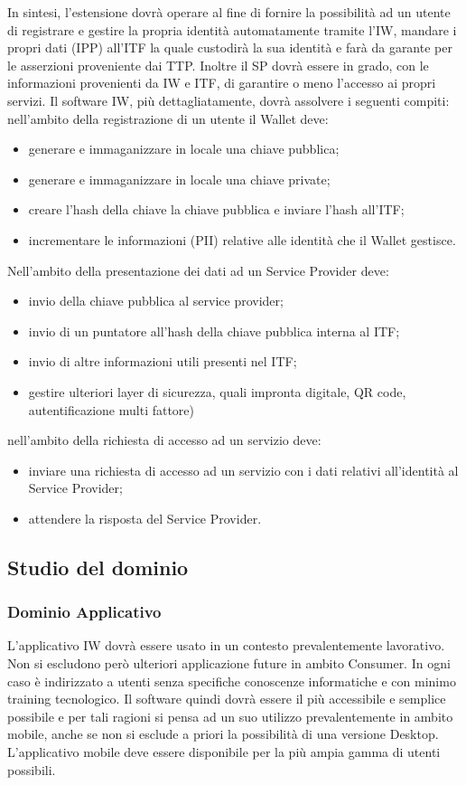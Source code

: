 In sintesi, l’estensione dovrà operare al fine di fornire la possibilità ad un utente di registrare e gestire la propria identità automatamente tramite l’IW, mandare i propri dati (IPP) all’ITF la quale custodirà la sua identità e farà da garante per le asserzioni proveniente dai TTP. Inoltre il SP dovrà essere in grado, con le informazioni provenienti da IW e ITF, di garantire o meno l’accesso ai propri servizi.
Il software IW, più dettagliatamente, dovrà assolvere i seguenti compiti:
nell’ambito della registrazione di un utente il Wallet deve:
\begin{itemize}
    \item generare e immaganizzare in locale una chiave pubblica;
    \item generare e immaganizzare in locale una chiave private;
    \item creare l’hash della chiave la chiave pubblica e inviare l’hash all’ITF;
    \item incrementare le informazioni (PII) relative alle identità che il Wallet gestisce.
\end{itemize}
Nell’ambito della presentazione dei dati ad un Service Provider deve:
\begin{itemize}
    \item invio della chiave pubblica al service provider;
    \item invio di un puntatore all’hash della chiave pubblica interna al ITF;
    \item invio di altre informazioni utili presenti nel ITF;
    \item gestire ulteriori layer di sicurezza, quali impronta digitale, QR code, autentificazione multi fattore)
\end{itemize}
nell’ambito della richiesta di accesso ad un servizio deve:
\begin{itemize}
    \item inviare una richiesta di accesso ad un servizio con i dati relativi all’identità al Service Provider;
    \item attendere la risposta del Service Provider.
\end{itemize}

\subsection{Studio del dominio}
\subsubsection{Dominio Applicativo}
L’applicativo IW dovrà essere usato in un contesto prevalentemente lavorativo. Non si escludono però ulteriori applicazione future in ambito Consumer. In ogni caso è indirizzato a utenti senza specifiche conoscenze informatiche e con minimo training tecnologico. Il software quindi dovrà essere il più accessibile e semplice possibile e per tali ragioni si pensa ad un suo utilizzo prevalentemente in ambito mobile, anche se non si esclude a priori la possibilità di una versione Desktop. L’applicativo mobile deve essere disponibile per la più ampia gamma di utenti possibili.
